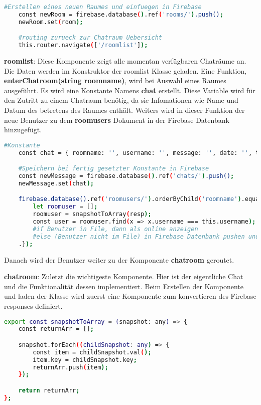 \begin{lstlisting}[language=bash]
    #Erstellen eines neuen Raumes und einfuegen in Firebase
    const newRoom = firebase.database().ref('rooms/').push();
    newRoom.set(room);

    #routing zurueck zur Chatraum Uebersicht
    this.router.navigate(['/roomlist']);
\end{lstlisting}

\textbf{roomlist}: Diese Komponente zeigt alle momentan verfügbaren Chaträume an. Die Daten werden im Konstruktor der roomlist Klasse geladen.\newline
Eine Funktion, \textbf{enterChatroom(string roomname)}, wird bei Auswahl eines Raumes ausgeführt. Es wird eine Konstante Namens \textbf{chat} erstellt. Diese Variable wird für den Zutritt zu einem Chatraum benötig, da sie 
Infomationen wie Name und Datum des betretens des Raumes enthält. Weiters wird in dieser Funktion der neue Benutzer zu dem \textbf{roomusers} Dokument in der Firebase Datenbank hinzugefügt.

\begin{lstlisting}[language=bash]
    #Konstante
    const chat = { roomname: '', username: '', message: '', date: '', type: '' };

    #Speichern bei fertig gesetzter Konstante in Firebase
    const newMessage = firebase.database().ref('chats/').push();
    newMessage.set(chat);

    firebase.database().ref('roomusers/').orderByChild('roomname').equalTo(roomname).on('value', (resp: any) => {
        let roomuser = [];
        roomuser = snapshotToArray(resp);
        const user = roomuser.find(x => x.username === this.username);
        #if Benutzer in File, dann als online anzeigen
        #else (Benutzer nicht im File) in Firebase Datenbank pushen und als online anzeigen
    .});
\end{lstlisting}

Danach wird der Benutzer weiter zu der Komponente \textbf{chatroom} geroutet.

\textbf{chatroom}: Zuletzt die wichtigeste Komponente. Hier ist der eigentliche Chat und die Funktionalität dessen implementiert. Beim Erstellen der Komponente und laden der Klasse wird zuerst eine Komponente zum konvertieren
des Firebase responses definiert.

\begin{lstlisting}[language=bash]
    export const snapshotToArray = (snapshot: any) => {
    const returnArr = [];

    snapshot.forEach((childSnapshot: any) => {
        const item = childSnapshot.val();
        item.key = childSnapshot.key;
        returnArr.push(item);
    });

    return returnArr;
};
\end{lstlisting}

